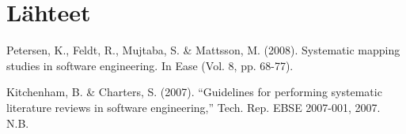 \documentclass{article}
\begin{document}
\section*{Lähteet}

Petersen, K., Feldt, R., Mujtaba, S. \& Mattsson, M. (2008).
Systematic mapping studies in software engineering.
In Ease (Vol. 8, pp. 68-77).

Kitchenham, B. \& Charters, S. (2007). “Guidelines for performing
systematic literature reviews in software engineering,”
Tech. Rep. EBSE 2007-001, 2007. N.B.
\end{document}
